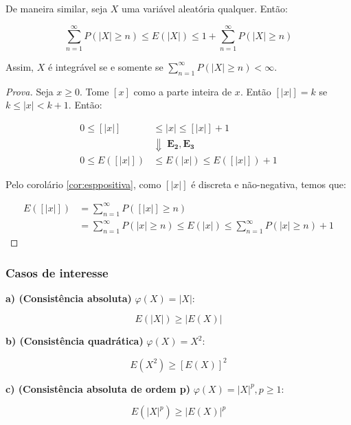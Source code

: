 \documentclass[
]{article}
\theoremstyle{definition}
\theoremstyle{definition}
\theoremstyle{definition}
\theoremstyle{definition}
\theoremstyle{remark}
\begin{document}
De maneira similar, seja \(X\) uma variável aleatória qualquer. Então:

\begin{equation*}
\sum_{n=1}^{\infty}P(|X| \ge n) \le E(|X|) \le 1 + \sum_{n=1}^{\infty}P(|X| \ge n)
\end{equation*}

Assim, \(X\) é integrável se e somente se \(\sum_{n=1}^{\infty}P(|X| \ge n) < \infty\).

\begin{proof}[Prova]
Seja \(x \ge 0\). Tome \([x]\) como a parte inteira de \(x\). Então \([|x|] = k\) se \(k \le |x| < k+1\). Então:

\begin{align*}
0 \le [|x|] &\le |x| \le [|x|] + 1 \\
&\Downarrow \; \mathbf{E_{2},E_{3}} \\
0 \le E([|x|]) &\le E(|x|) \le E([|x|]) + 1
\end{align*}

Pelo corolário \ref{cor:esppositiva}, como \([|x|]\) é discreta e não-negativa, temos que:

\begin{align*}
E([|x|]) &= \sum_{n=1}^{\infty}P([|x|] \ge n) \\
&= \sum_{n=1}^{\infty}P(|x| \ge n) \le E(|x|) \le \sum_{n=1}^{\infty}P(|x| \ge n) + 1
\end{align*}
\end{proof}

\hypertarget{casos-de-interesse}{%
\subsubsection{Casos de interesse}\label{casos-de-interesse}}

\textbf{a) (Consistência absoluta)} \(\varphi(X) = |X|\):

\begin{equation*}
E(|X|) \ge |E(X)|
\end{equation*}

\textbf{b) (Consistência quadrática)} \(\varphi(X) = X^{2}\):

\begin{equation*}
E(X^{2}) \ge [E(X)]^{2}
\end{equation*}

\textbf{c) (Consistência absoluta de ordem p)} \(\varphi(X) = |X|^{p}, p \ge 1\):

\begin{equation*}
E(|X|^{p}) \ge |E(X)|^{p}
\end{equation*}
\end{document}
